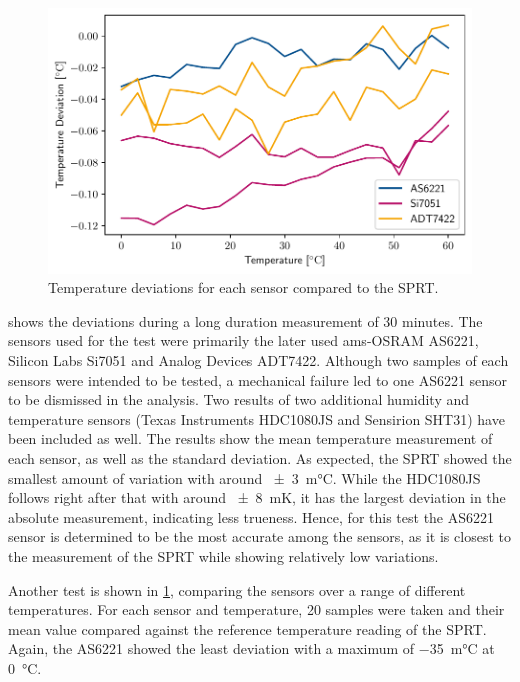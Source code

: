 \begin{figure}[t!]
    \centering
    \includegraphics{graphs/tempsensors_dev.pdf}
    \caption{Temperature deviations for each sensor compared to the \gls{SPRT}.}
    \label{g:temp_dev}
\end{figure}

 shows the deviations during a long duration measurement of 30 minutes. The sensors used for the test were primarily the later used ams-OSRAM AS6221, Silicon Labs Si7051 and Analog Devices ADT7422. Although two samples of each sensors were intended to be tested, a mechanical failure led to one AS6221 sensor to be dismissed in the analysis. Two results of two additional humidity and temperature sensors (Texas Instruments HDC1080JS and Sensirion SHT31) have been included as well. The results show the mean temperature measurement of each sensor, as well as the standard deviation. As expected, the \gls{SPRT} showed the smallest amount of variation with around \qty{\pm 3}{\milli\celsius}. While the HDC1080JS follows right after that with around \qty{\pm 8}{\milli\kelvin}, it has the largest deviation in the absolute measurement, indicating less trueness. Hence, for this test the AS6221 sensor is determined to be the most accurate among the sensors, as it is closest to the measurement of the \gls{SPRT} while showing relatively low variations.

Another test is shown in \cref{g:temp_dev}, comparing the sensors over a range of different temperatures. For each sensor and temperature, 20 samples were taken and their mean value compared against the reference temperature reading of the \gls{SPRT}. Again, the AS6221 showed the least deviation with a maximum of \qty{-35}{\milli\celsius} at \qty{0}{\celsius}.

